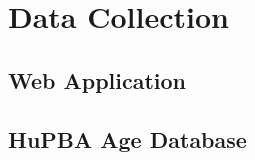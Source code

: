 \chapter{Data Collection} \label{chap:data}

\section{Web Application}

\section{HuPBA Age Database}